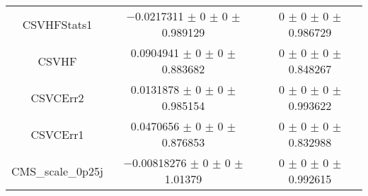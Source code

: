 \begin{table}
\begin{tabular}{ccc}
CSVHFStats1 & \num{-0.0217311} $\pm$ \num{0} $\pm$ \num{0} $\pm$ \num{0.989129} & \num{0} $\pm$ \num{0} $\pm$ \num{0} $\pm$ \num{0.986729}\\
CSVHF & \num{0.0904941} $\pm$ \num{0} $\pm$ \num{0} $\pm$ \num{0.883682} & \num{0} $\pm$ \num{0} $\pm$ \num{0} $\pm$ \num{0.848267}\\
CSVCErr2 & \num{0.0131878} $\pm$ \num{0} $\pm$ \num{0} $\pm$ \num{0.985154} & \num{0} $\pm$ \num{0} $\pm$ \num{0} $\pm$ \num{0.993622}\\
CSVCErr1 & \num{0.0470656} $\pm$ \num{0} $\pm$ \num{0} $\pm$ \num{0.876853} & \num{0} $\pm$ \num{0} $\pm$ \num{0} $\pm$ \num{0.832988}\\
CMS\_scale\_0p25j & \num{-0.00818276} $\pm$ \num{0} $\pm$ \num{0} $\pm$ \num{1.01379} & \num{0} $\pm$ \num{0} $\pm$ \num{0} $\pm$ \num{0.992615}\\
\bottomrule
\end{tabular}
\end{table}